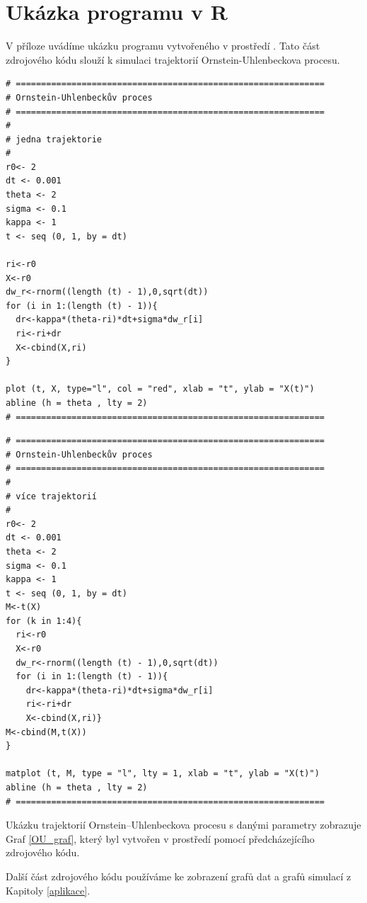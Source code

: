 \documentclass[a4paper,12pt]{report}
\makeatletter
\theoremstyle{definition} \newtheorem{definice}[veta]{Definice}
\theoremstyle{remark}
\def\R{\scalebox{\f@size}{\usebox\rbox}\xspace}
\makeatother
\begin{document}
\section*{Ukázka programu v R}

V příloze uvádíme ukázku programu vytvořeného v prostředí \R. 
Tato část zdrojového kódu slouží k simulaci trajektorií Ornstein-Uhlenbeckova procesu.

\begin{verbatim}
# =============================================================
# Ornstein-Uhlenbeckův proces 
# =============================================================
#
# jedna trajektorie
#
r0<- 2
dt <- 0.001
theta <- 2
sigma <- 0.1
kappa <- 1
t <- seq (0, 1, by = dt)

ri<-r0
X<-r0
dw_r<-rnorm((length (t) - 1),0,sqrt(dt))    
for (i in 1:(length (t) - 1)){  
  dr<-kappa*(theta-ri)*dt+sigma*dw_r[i] 
  ri<-ri+dr
  X<-cbind(X,ri)
}

plot (t, X, type="l", col = "red", xlab = "t", ylab = "X(t)")
abline (h = theta , lty = 2)  
# =============================================================
\end{verbatim}

\newpage

\begin{verbatim}
# =============================================================
# Ornstein-Uhlenbeckův proces 
# =============================================================
#
# více trajektorií
#
r0<- 2
dt <- 0.001
theta <- 2
sigma <- 0.1
kappa <- 1
t <- seq (0, 1, by = dt)
M<-t(X)
for (k in 1:4){
  ri<-r0
  X<-r0
  dw_r<-rnorm((length (t) - 1),0,sqrt(dt))    
  for (i in 1:(length (t) - 1)){  
    dr<-kappa*(theta-ri)*dt+sigma*dw_r[i] 
    ri<-ri+dr
    X<-cbind(X,ri)}
M<-cbind(M,t(X))
}

matplot (t, M, type = "l", lty = 1, xlab = "t", ylab = "X(t)")
abline (h = theta , lty = 2)  
# =============================================================
\end{verbatim}

Ukázku trajektorií Ornstein–Uhlenbeckova procesu s danými parametry zobrazuje Graf \ref{OU_graf}, který byl vytvořen v prostředí \R pomocí předcházejícího zdrojového kódu.

\newpage
Další část zdrojového kódu používáme ke zobrazení grafů dat a grafů simulací z Kapitoly \ref{aplikace}.
\end{document}
